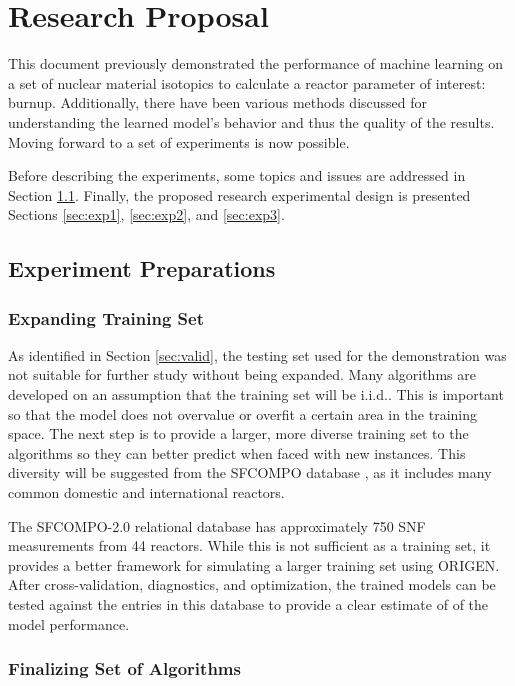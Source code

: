 \chapter{Research Proposal}
\label{ch:proposal}

This document previously demonstrated the performance of machine learning on a
set of nuclear material isotopics to calculate a reactor parameter of interest:
burnup.  Additionally, there have been various methods discussed for
understanding the learned model's behavior and thus the quality of the results.
Moving forward to a set of experiments is now possible.

Before describing the experiments, some topics and issues are addressed in
Section \ref{sec:prep}.  Finally, the proposed research experimental design is
presented Sections \ref{sec:exp1}, \ref{sec:exp2}, and \ref{sec:exp3}.

\section{Experiment Preparations}
\label{sec:prep}

\subsection*{Expanding Training Set}

As identified in Section \ref{sec:valid}, the testing set used for the
demonstration was not suitable for further study without being expanded.  Many
algorithms are developed on an assumption that the training set will be
\gls{i.i.d.}.  This is important so that the model does not overvalue or
overfit a certain area in the training space.  The next step is to provide a
larger, more diverse training set to the algorithms so they can better predict
when faced with new instances. This diversity will be suggested from the
\gls{SFCOMPO} database \cite{sfcompo}, as it includes many common domestic and 
international reactors.

The SFCOMPO-2.0 relational database \cite{sfcompo} has approximately 750
\gls{SNF} measurements from 44 reactors. While this is not sufficient as a
training set, it provides a better framework for simulating a larger training
set using \gls{ORIGEN}.  After cross-validation, diagnostics, and optimization,
the trained models can be tested against the entries in this database to
provide a clear estimate of of the model performance. 

\subsection*{Finalizing Set of Algorithms}

